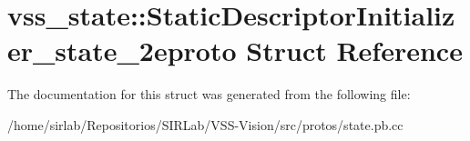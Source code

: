 \hypertarget{structvss__state_1_1StaticDescriptorInitializer__state__2eproto}{\section{vss\-\_\-state\-:\-:Static\-Descriptor\-Initializer\-\_\-state\-\_\-2eproto Struct Reference}
\label{structvss__state_1_1StaticDescriptorInitializer__state__2eproto}
}


The documentation for this struct was generated from the following file\-:\begin{DoxyCompactItemize}
\item 
/home/sirlab/\-Repositorios/\-S\-I\-R\-Lab/\-V\-S\-S-\/\-Vision/src/protos/state.\-pb.\-cc\end{DoxyCompactItemize}
